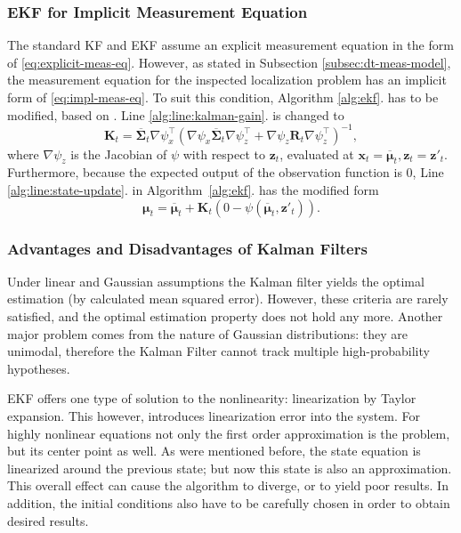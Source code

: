 \subsubsection{EKF for Implicit Measurement Equation}

The standard KF and EKF assume an explicit measurement equation in the form of \eqref{eq:explicit-meas-eq}.
However, as stated in Subsection \ref{subsec:dt-meas-model}, the measurement equation for the inspected
localization problem has an implicit form of \eqref{eq:impl-meas-eq}.
To suit this condition, Algorithm \ref{alg:ekf}. has to be modified, based on \cite{Steffen2013,Zhang2012}.
Line \ref{alg:line:kalman-gain}. is changed to
\begin{equation}
  \mathbf{K}_t = \overline{\mathbf{\Sigma}}_t\nabla \psi_x^\top\left(\nabla \psi_x\overline{\mathbf{\Sigma}}_t\nabla \psi_z^\top+
  \nabla \psi_z\mathbf{R}_t\nabla \psi^{\top}_z\right)^{-1},
\end{equation}
where $\nabla \psi_z$ is the Jacobian of $\psi$ with respect to $\mathbf{z}_t$, evaluated at
$\mathbf{x}_t = \overline{\boldsymbol{\mu}}_t, \mathbf{z}_t = \mathbf{z}'_t$.
Furthermore, because the expected output of the observation function is 0, Line \ref{alg:line:state-update}. in Algorithm~\ref{alg:ekf}. has the modified form
\begin{equation}
  \boldsymbol{\mu}_t = \overline{\boldsymbol{\mu}}_t + \mathbf{K}_t\left(0-\psi(\overline{\boldsymbol{\mu}}_t,\mathbf{z}'_t)\right).
\end{equation}
\subsubsection{Advantages and Disadvantages of Kalman Filters}

Under linear and Gaussian assumptions the Kalman filter yields the optimal estimation (by calculated mean squared error). However, these criteria are rarely satisfied, and the optimal estimation property does not hold any more. Another major problem comes from the nature of Gaussian distributions: they are unimodal, therefore the Kalman Filter cannot track multiple high-probability hypotheses.

EKF offers one type of solution to the nonlinearity: linearization by Taylor expansion. This however, introduces linearization error into the system. For highly nonlinear equations not only the first order approximation is the problem, but its center point as well. As were mentioned before, the state equation is linearized around the previous state; but now this state is also an approximation. This overall effect can cause the algorithm to diverge, or to yield poor results. In addition, the initial conditions also have to be carefully chosen in order to obtain desired results.

